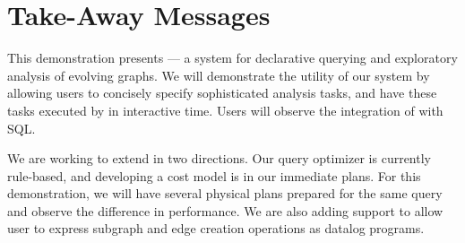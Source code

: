 \section{Take-Away Messages}
\label{sec:conc}

This demonstration presents \sys --- a system for declarative querying
and exploratory analysis of evolving graphs.  We will demonstrate the
utility of our system by allowing users to concisely specify
sophisticated analysis tasks, and have these tasks executed by \sys in
interactive time.  Users will observe the integration of \ql with SQL.

We are working to extend \sys in two directions.  Our query optimizer
is currently rule-based, and developing a cost model is in our
immediate plans.  For this demonstration, we will have several
physical plans prepared for the same query and observe the difference
in performance.  We are also adding support to allow user to express
subgraph and edge creation operations as datalog programs.


